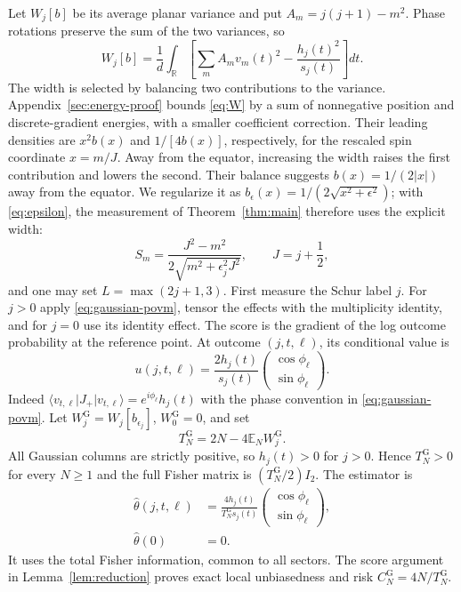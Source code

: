 \documentclass[aps,pra,reprint,superscriptaddress,longbibliography]{revtex4-2}
\theoremstyle{remark}
\newcommand{\E}{\mathbb E}
\newcommand{\R}{\mathbb R}
\newcommand{\ket}[1]{\lvert#1\rangle}
\newcommand{\bra}[1]{\langle#1\rvert}
\newcommand{\g}{\mathrm G}
\begin{document}
Let $W_j[b]$ be its average planar variance and put
$A_m=j(j+1)-m^2$. Phase rotations preserve the sum of the two
variances, so
\begin{equation}
 W_j[b]=\frac1d\int_\R
 \left[\sum_m A_m v_m(t)^2-\frac{h_j(t)^2}{s_j(t)}\right]dt.
 \label{eq:W}
\end{equation}
The width is selected by balancing two contributions to the variance.
Appendix~\ref{sec:energy-proof} bounds \eqref{eq:W} by a sum of
nonnegative position and discrete-gradient energies, with a smaller
coefficient correction. Their leading densities are $x^2b(x)$ and
$1/[4b(x)]$, respectively, for the rescaled spin coordinate $x=m/J$.
Away from the equator, increasing the width raises the first contribution
and lowers the second.
Their balance suggests $b(x)=1/(2|x|)$ away from the equator.
We regularize it as $b_\epsilon(x)=1/(2\sqrt{x^2+\epsilon^2})$;
with \eqref{eq:epsilon}, the measurement of Theorem~\ref{thm:main}
therefore uses the explicit width:
\begin{equation}
 S_m=\frac{J^2-m^2}{2\sqrt{m^2+\epsilon_j^2J^2}},\qquad
 J=j+\frac12,
 \label{eq:explicit-width}
\end{equation}
and one may set $L=\max(2j+1,3)$. First measure the Schur label $j$.
For $j>0$ apply \eqref{eq:gaussian-povm}, tensor the effects with
the multiplicity identity, and for $j=0$ use its identity effect.
The score is the gradient of the log outcome probability at the
reference point. At outcome $(j,t,\ell)$, its conditional value is
\begin{equation}
 u(j,t,\ell)=\frac{2h_j(t)}{s_j(t)}
 \begin{pmatrix}\cos\phi_\ell\\ \sin\phi_\ell\end{pmatrix}.
 \label{eq:score}
\end{equation}
Indeed $\bra{v_{t,\ell}}J_+\ket{v_{t,\ell}}=e^{i\phi_\ell}h_j(t)$
with the phase convention in \eqref{eq:gaussian-povm}.
Let $W_j^{\g}=W_j[b_{\epsilon_j}]$, $W_0^{\g}=0$, and set
\begin{equation}
 T_N^{\g}=2N-4\E_NW_j^{\g}.
 \label{eq:TN}
\end{equation}
All Gaussian columns are strictly positive, so $h_j(t)>0$ for
$j>0$. Hence $T_N^{\g}>0$ for every $N\geq1$ and the full Fisher
matrix is $(T_N^{\g}/2)I_2$. The estimator is
\begin{equation}
\begin{aligned}
\widehat\theta(j,t,\ell)&=
\frac{4h_j(t)}{T_N^{\g}s_j(t)}
\begin{pmatrix}\cos\phi_\ell\\ \sin\phi_\ell\end{pmatrix},\\
\widehat\theta(0)&=0.
\end{aligned}
\label{eq:estimator}
\end{equation}
It uses the total Fisher information, common to all sectors. The
score argument in Lemma~\ref{lem:reduction} proves exact local
unbiasedness and risk $C_N^{\g}=4N/T_N^{\g}$.
\end{document}
